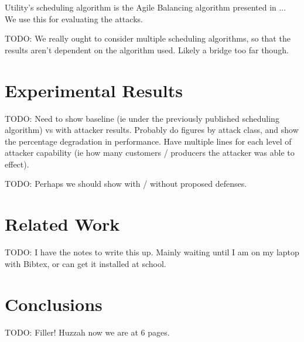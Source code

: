 \documentclass[conference]{IEEEtran}
\begin{document}
Utility's scheduling algorithm is the Agile Balancing algorithm presented in ... We use this for evaluating the attacks.

TODO:  We really ought to consider multiple scheduling algorithms, so that the results aren't dependent on the algorithm 
used.  Likely a bridge too far though.

\section{Experimental Results}

TODO: Need to show baseline (ie under the previously published scheduling algorithm) vs with attacker results.  Probably
do figures by attack class, and show the percentage degradation in performance.  Have multiple lines for each level of attacker
capability (ie how many customers / producers the attacker was able to effect).

TODO: Perhaps we should show with / without proposed defenses.

\section{Related Work}

TODO: I have the notes to write this up.  Mainly waiting until I am on my laptop with Bibtex, or can get it installed at school.

\section{Conclusions}

TODO:  Filler!  Huzzah now we are at 6 pages.



\end{document}
